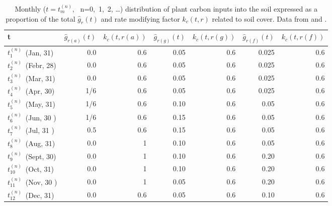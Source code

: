 \begin{table}[t]
     \centering
  \scriptsize{
  \begin{tabular}{||l||r|r|r|r|r|r||}
\hline
\hline
t & $\hat g_{r(a)}(t)$ & $k_c(t,r(a))$ & $\hat g_{r(g)}(t)$ &$k_c(t,r(g))$ & $\hat g_{r(f)}(t)$ & $k_c(t,r(f))$\\
\hline
\hline
$t^{(n)}_1$\, (Jan, 31) & 0.0 &0.6 & 0.05&0.6 & 0.025 & 0.6\\
\hline
$t^{(n)}_2$\, (Febr, 28) & 0.0 &0.6 & 0.05 & 0.6& 0.025 & 0.6\\
\hline
$t^{(n)}_3$\, (Mar, 31) & 0.0 &0.6 &0.05 & 0.6& 0.025 & 0.6\\
\hline
$t^{(n)}_4$\, (Apr, 30) & 1/6 & 0.6 & 0.05 & 0.6 & 0.025 &0.6 \\
\hline
$t^{(n)}_5$\, (May, 31) & 1/6 & 0.6 & 0.10 & 0.6& 0.05 & 0.6\\
\hline
$t^{(n)}_6$\, (Jun, 30 ) & 1/6 & 0.6& 0.15 & 0.6& 0.05 & 0.6 \\
\hline
$t^{(n)}_7$\, (Jul, 31 ) & 0.5 & 0.6& 0.15 & 0.6& 0.05 & 0.6 \\
\hline
$t^{(n)}_8$\, (Aug, 31) & 0.0 & 1& 0.10 &0.6 & 0.05 & 0.6\\
\hline
$t^{(n)}_9$\, (Sept, 30) & 0.0 & 1& 0.10 & 0.6& 0.20 & 0.6\\
\hline
$t^{(n)}_{10}$\, (Oct, 31) & 0.0 & 1 & 0.10 & 0.6 & 0.20 & 0.6\\
\hline
$t^{(n)}_{11}$\, (Nov, 30 ) & 0.0 & 1 & 0.05 & 0.6 & 0.20 & 0.6\\
\hline
$t^{(n)}_{12}$\, (Dec, 31) & 0.0 & 0.6 &0.05 & 0.6 & 0.10 & 0.6\\
\hline
\hline
\end{tabular}}
 \caption{Monthly ($t=t^{(n)}_m$, \,  n=0,\, 1,\, 2, \dots) distribution of plant carbon inputs into the soil expressed as a proportion of the total $\hat g_r(t)$ and rate modifying factor $k_c(t,r)$ related to soil cover. Data from \cite{gottschalk2012will} and \cite{smith2005projected}.}
     \label{tab:pagf}
      \end{table}

